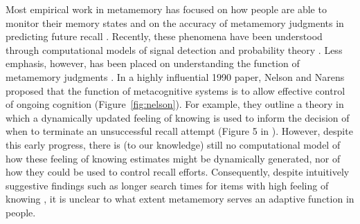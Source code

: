 Most empirical work in metamemory has focused on how people are able to monitor their memory states \citep{reder1992determines,miner1994new,eakin2005illusions} and on the accuracy of metamemory judgments in predicting future recall \citep{hart1965memory,vesonder1985ability,dunlosky1992importance,dunlosky2007metacomprehension}. Recently, these phenomena have been understood through computational models of signal detection \citep{jang2012stochastic} and probability theory \citep{hu2021bayesian}. Less emphasis, however, has been placed on understanding the function of metamemory judgments \citep{schwartz2017metamemory}. In a highly influential 1990 paper, Nelson and Narens proposed that the function of metacognitive systems is to allow effective control of ongoing cognition (Figure~\ref{fig:nelson}). For example, they outline a theory in which a dynamically updated feeling of knowing is used to inform the decision of when to terminate an unsuccessful recall attempt (Figure 5 in \citealpnelson{}). However, despite this early progress, there is (to our knowledge) still no computational model of how these feeling of knowing estimates might be dynamically generated, nor of how they could be used to control recall efforts. Consequently, despite intuitively suggestive findings such as longer search times for items with high feeling of knowing \citep{nelson1984comparison,nhouyvanisvong1998rapid,gruneberg1977methodological,lachman1979metamemory}, it is unclear to what extent metamemory serves an adaptive function in people.





